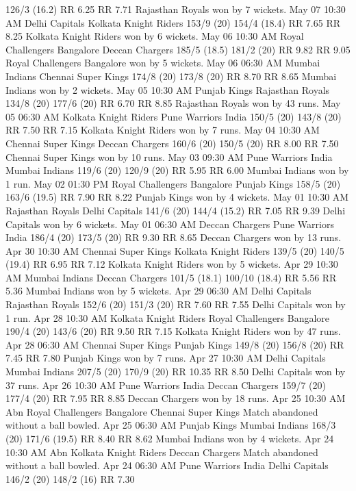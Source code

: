 126/3 (16.2)
RR 6.25
RR 7.71
Rajasthan Royals won by 7 wickets.
May 07
10:30 AM
Delhi Capitals
Kolkata Knight Riders
153/9 (20)
154/4 (18.4)
RR 7.65
RR 8.25
Kolkata Knight Riders won by 6 wickets.
May 06
10:30 AM
Royal Challengers Bangalore
Deccan Chargers
185/5 (18.5)
181/2 (20)
RR 9.82
RR 9.05
Royal Challengers Bangalore won by 5 wickets.
May 06
06:30 AM
Mumbai Indians
Chennai Super Kings
174/8 (20)
173/8 (20)
RR 8.70
RR 8.65
Mumbai Indians won by 2 wickets.
May 05
10:30 AM
Punjab Kings
Rajasthan Royals
134/8 (20)
177/6 (20)
RR 6.70
RR 8.85
Rajasthan Royals won by 43 runs.
May 05
06:30 AM
Kolkata Knight Riders
Pune Warriors India
150/5 (20)
143/8 (20)
RR 7.50
RR 7.15
Kolkata Knight Riders won by 7 runs.
May 04
10:30 AM
Chennai Super Kings
Deccan Chargers
160/6 (20)
150/5 (20)
RR 8.00
RR 7.50
Chennai Super Kings won by 10 runs.
May 03
09:30 AM
Pune Warriors India
Mumbai Indians
119/6 (20)
120/9 (20)
RR 5.95
RR 6.00
Mumbai Indians won by 1 run.
May 02
01:30 PM
Royal Challengers Bangalore
Punjab Kings
158/5 (20)
163/6 (19.5)
RR 7.90
RR 8.22
Punjab Kings won by 4 wickets.
May 01
10:30 AM
Rajasthan Royals
Delhi Capitals
141/6 (20)
144/4 (15.2)
RR 7.05
RR 9.39
Delhi Capitals won by 6 wickets.
May 01
06:30 AM
Deccan Chargers
Pune Warriors India
186/4 (20)
173/5 (20)
RR 9.30
RR 8.65
Deccan Chargers won by 13 runs.
Apr 30
10:30 AM
Chennai Super Kings
Kolkata Knight Riders
139/5 (20)
140/5 (19.4)
RR 6.95
RR 7.12
Kolkata Knight Riders won by 5 wickets.
Apr 29
10:30 AM
Mumbai Indians
Deccan Chargers
101/5 (18.1)
100/10 (18.4)
RR 5.56
RR 5.36
Mumbai Indians won by 5 wickets.
Apr 29
06:30 AM
Delhi Capitals
Rajasthan Royals
152/6 (20)
151/3 (20)
RR 7.60
RR 7.55
Delhi Capitals won by 1 run.
Apr 28
10:30 AM
Kolkata Knight Riders
Royal Challengers Bangalore
190/4 (20)
143/6 (20)
RR 9.50
RR 7.15
Kolkata Knight Riders won by 47 runs.
Apr 28
06:30 AM
Chennai Super Kings
Punjab Kings
149/8 (20)
156/8 (20)
RR 7.45
RR 7.80
Punjab Kings won by 7 runs.
Apr 27
10:30 AM
Delhi Capitals
Mumbai Indians
207/5 (20)
170/9 (20)
RR 10.35
RR 8.50
Delhi Capitals won by 37 runs.
Apr 26
10:30 AM
Pune Warriors India
Deccan Chargers
159/7 (20)
177/4 (20)
RR 7.95
RR 8.85
Deccan Chargers won by 18 runs.
Apr 25
10:30 AM
Abn
Royal Challengers Bangalore
Chennai Super Kings
Match abandoned without a ball bowled.
Apr 25
06:30 AM
Punjab Kings
Mumbai Indians
168/3 (20)
171/6 (19.5)
RR 8.40
RR 8.62
Mumbai Indians won by 4 wickets.
Apr 24
10:30 AM
Abn
Kolkata Knight Riders
Deccan Chargers
Match abandoned without a ball bowled.
Apr 24
06:30 AM
Pune Warriors India
Delhi Capitals
146/2 (20)
148/2 (16)
RR 7.30
